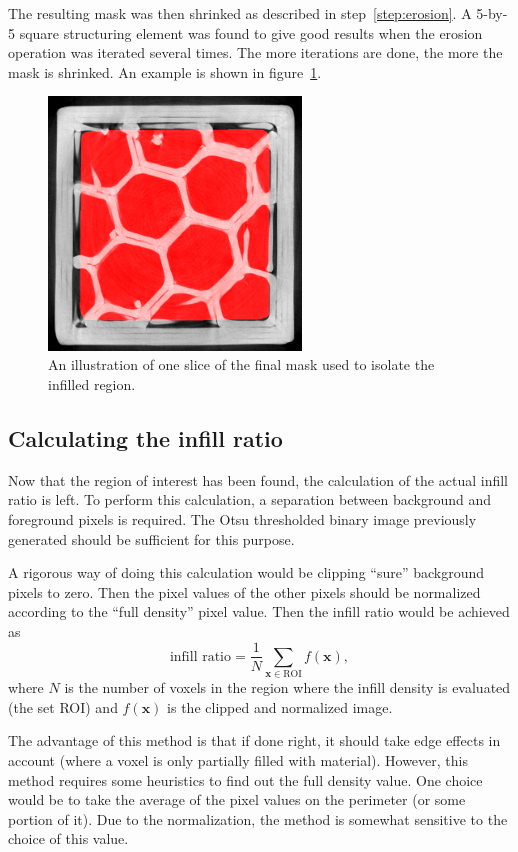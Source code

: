 \documentclass[a4paper,twoside,12pt]{article}
\begin{document}
The resulting mask was then shrinked as described in step~\ref{step:erosion}. A 5-by-5 square structuring element was found to give good results when the erosion operation was iterated several times. The more iterations are done, the more the mask is shrinked. An example is shown in figure~\ref{fig:eroded}.
\begin{figure}
    \centering
    \includegraphics[width=0.6\textwidth]{images/eroded_24.png}
    \caption{An illustration of one slice of the final mask used to isolate the infilled region.}
    \label{fig:eroded}
\end{figure}

\subsection{Calculating the infill ratio}
Now that the region of interest has been found, the calculation of the actual infill ratio is left. To perform this calculation, a separation between background and foreground pixels is required. The Otsu thresholded binary image previously generated should be sufficient for this purpose.

A rigorous way of doing this calculation would be clipping ``sure'' background pixels to zero. Then the pixel values of the other pixels should be normalized according to the ``full density'' pixel value. Then the infill ratio would be achieved as
\[
    \text{infill ratio} = \frac{1}{N} \sum\limits_{\mathbf{x} \in \text{ROI}} f(\mathbf{x}),
\]
where $N$ is the number of voxels in the region where the infill density is evaluated (the set ROI) and $f(\mathbf{x})$ is the clipped and normalized image.

The advantage of this method is that if done right, it should take edge effects in account (where a voxel is only partially filled with material). However, this method requires some heuristics to find out the full density value. One choice would be to take the average of the pixel values on the perimeter (or some portion of it). Due to the normalization, the method is somewhat sensitive to the choice of this value.
\end{document}
